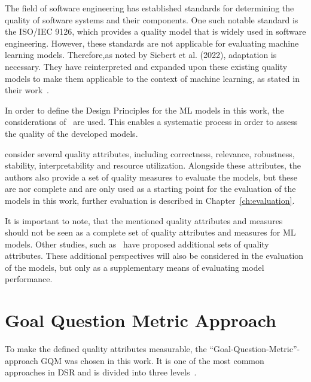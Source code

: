 The field of software engineering has established standards for determining the quality of software systems and their
components.
One such notable standard is the ISO/IEC 9126, which provides a quality model that is widely used in
software engineering.
However, these standards are not applicable for evaluating machine learning models.
Therefore,as noted by Siebert et al. (2022), adaptation is necessary. They have reinterpreted and expanded upon these
existing quality models to make them applicable to the context of machine learning, as stated in their
work~\cite[p. 1]{siebert2022construction}.

In order to define the Design Principles for the \ac{ML} models in this work, the
considerations of~\cite[]{siebert2022construction} are used.
This enables a systematic process in order to assess the quality of the developed models.

\cite{siebert2022construction} consider several quality attributes, including
correctness, relevance, robustness, stability, interpretability and resource utilization.
Alongside these attributes, the authors also provide a set of quality measures to evaluate the
models, but these are nor complete and are only used as a starting point for the evaluation of the
models in this work, further evaluation is described in Chapter~\ref{ch:evaluation}.

It is important to note, that the mentioned quality attributes and measures should
not be seen as a complete set of quality attributes and measures for \ac{ML} models.
Other studies, such as~\cite{zhang2020machine} have proposed additional sets of quality attributes.
These additional perspectives will also be considered in the evaluation of the models, but only
as a supplementary means of evaluating model performance.


\section{Goal Question Metric Approach}\label{subsec:goal-question-metric-approach}
To make the defined quality attributes measurable, the “Goal-Question-Metric”-approach \ac{GQM}
was chosen in this work.
It is one of the most common approaches in DSR and is divided into three levels~\cite[p. 3]{basili_goalquestionmetric_}.

